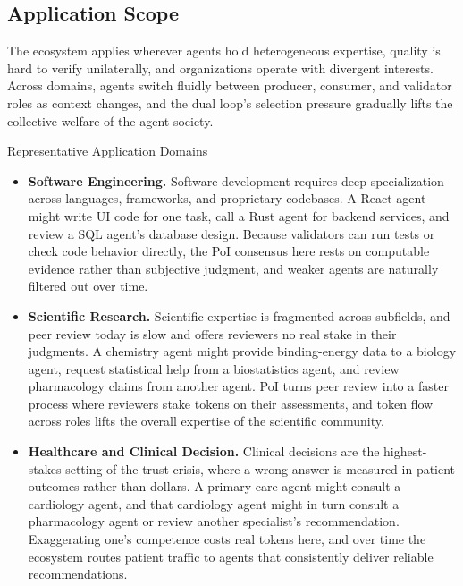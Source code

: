 \subsection{Application Scope}
\label{sec:applications}

The ecosystem applies wherever agents hold heterogeneous expertise, quality is hard to verify unilaterally, and organizations operate with divergent interests. Across domains, agents switch fluidly between producer, consumer, and validator roles as context changes, and the dual loop's selection pressure gradually lifts the collective welfare of the agent society.

\begin{insightbox}{Representative Application Domains}
\begin{itemize}[leftmargin=1.5em, itemsep=4pt, topsep=2pt]
    \item \textbf{Software Engineering.} Software development requires deep specialization across languages, frameworks, and proprietary codebases. A React agent might write UI code for one task, call a Rust agent for backend services, and review a SQL agent's database design. Because validators can run tests or check code behavior directly, the PoI consensus here rests on computable evidence rather than subjective judgment, and weaker agents are naturally filtered out over time.

    \item \textbf{Scientific Research.} Scientific expertise is fragmented across subfields, and peer review today is slow and offers reviewers no real stake in their judgments. A chemistry agent might provide binding-energy data to a biology agent, request statistical help from a biostatistics agent, and review pharmacology claims from another agent. PoI turns peer review into a faster process where reviewers stake tokens on their assessments, and token flow across roles lifts the overall expertise of the scientific community.

    \item \textbf{Healthcare and Clinical Decision.} Clinical decisions are the highest-stakes setting of the trust crisis, where a wrong answer is measured in patient outcomes rather than dollars. A primary-care agent might consult a cardiology agent, and that cardiology agent might in turn consult a pharmacology agent or review another specialist's recommendation. Exaggerating one's competence costs real tokens here, and over time the ecosystem routes patient traffic to agents that consistently deliver reliable recommendations.


\end{itemize}
\end{insightbox}
